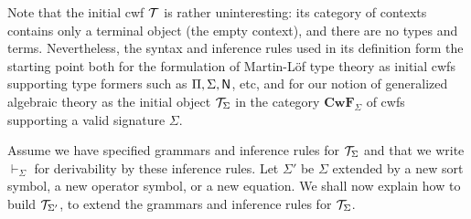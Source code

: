 \documentclass{lmcs}
\def\Cwf{\mathbf{CwF}}
\begin{document}
Note that the initial cwf ${\mathcal T}$ is rather uninteresting: its category of contexts contains only a terminal object (the empty context), and there are no types and terms. Nevertheless, the syntax and inference rules used in its definition form the starting point both for the formulation of Martin-Löf type theory as initial cwfs supporting type formers such as $\Pi, \Sigma, \mathsf{N}$, etc, and for our notion of generalized algebraic theory as the initial object ${\mathcal T}_\Sigma$ in the category $\Cwf_\Sigma$ of cwfs supporting a valid signature $\Sigma$.


Assume we have specified grammars and inference rules for ${\mathcal T}_\Sigma$ and that we write $\vdash_\Sigma$ for derivability by these inference rules. Let $\Sigma'$ be $\Sigma$ extended by a new sort symbol, a new operator symbol, or a new equation. We shall now explain how to build ${\mathcal T}_{\Sigma'}$, to extend the grammars and inference rules for ${\mathcal T}_\Sigma$.
\end{document}
